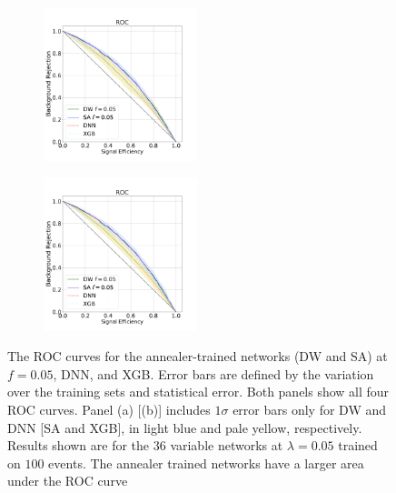\begin{figure}
\centering
\begin{subfigure}
  \centering
  \includegraphics[width=0.49\textwidth]{ROC_example_100DWDNN}
\end{subfigure}%
\begin{subfigure}
  \centering
\includegraphics[width=0.49\textwidth]{ROC_example_100SAXGB}\end{subfigure}
  \caption{The ROC curves for the annealer-trained networks (DW and SA) at $f=0.05$, DNN, and XGB. Error bars are defined by the variation over the training sets and statistical error. Both panels show all four ROC curves. Panel (a) [(b)] includes $1\sigma$ error bars only for DW and DNN [SA and XGB], in light blue and pale yellow, respectively. Results shown are for the $36$ variable networks at $\lambda=0.05$ trained on $100$ events. The annealer trained networks have a larger area under the ROC curve}
 \label{fig:ROC_example}
  \end{figure}

